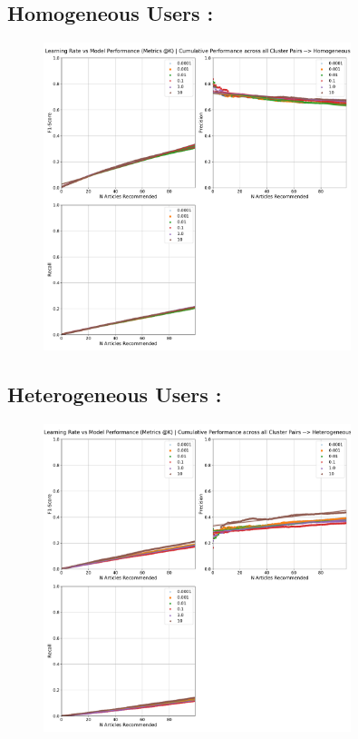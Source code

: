 \documentclass[a4paper,fontsize=9.0pt]{scrartcl}
\begin{document}
\subsection{Homogeneous Users :}
\vspace{-3ex}
\begin{figure}[H]
 \includegraphics[width=0.8\textwidth]{Graphs/lr_vs_model_performance_cumu_Homogeneous.pdf}
\end{figure}
\subsection{Heterogeneous Users :}
\vspace{-3ex}
\begin{figure}[H]
 \includegraphics[width=0.8\textwidth]{Graphs/lr_vs_model_performance_cumu_Heterogeneous.pdf}
\end{figure}
\end{document}
